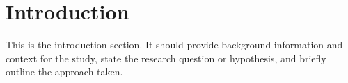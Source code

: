 \section{Introduction}
\label{sec:introduction}

This is the introduction section. It should provide background information and context for the study, state the research question or hypothesis, and briefly outline the approach taken.


